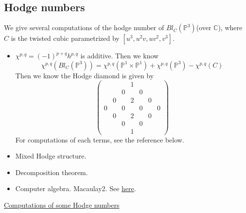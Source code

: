 \documentclass[../main.tex]{subfiles}
\begin{document}
\subsection{Hodge numbers}
\begin{example}
We give several computations of the hodge number of $Bl_{C}(\mathbb{P}^{3})$(over $\mathbb{C}$), where $C$ is the twisted cubic parametrized by $[u^{3}, u^{2}v, uv^{2}, v^{3}]$.
\begin{itemize}
\item $\chi^{p,q}=(-1)^{p+q}h^{p,q}$ is additive. Then we know 
$$\chi^{p,q}(Bl_{C}(\mathbb{P}^{3}))=\chi^{p,q}(\mathbb{P}^{1}\times \mathbb{P}^{1})+\chi^{p,q}(\mathbb{P}^{3})-\chi^{p,q}(C)$$
Then we know the Hodge diamond is given by 
$$\begin{pmatrix} & & & 1& & & \\
 & & 0& &0 & &\\
  & 0& & 2& &0 &\\
   0& & 0 & &0 & &0\\
    & 0& & 2& &0 &\\
     & & 0& &0 & &\\
      & & & 1& & &\end{pmatrix}$$
For computations of each terms, see the reference below.
\item Mixed Hodge structure.
\item Decomposition theorem.
\item Computer algebra. Macaulay2. See \href{http://www2.macaulay2.com/Macaulay2/doc/Macaulay2-1.10/share/doc/Macaulay2/Schubert2/html/_blowup.html}{here}.
\end{itemize}
\end{example}
\begin{remark}[refenrence]
\href{http://www.math.purdue.edu/~dvb/preprints/book-chap17.pdf}{Computations of some Hodge numbers}
\end{remark}
\end{document}

